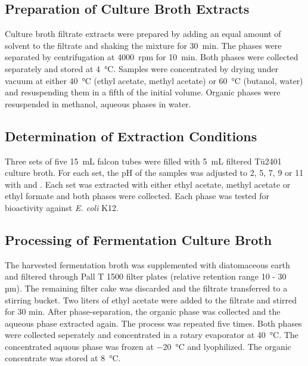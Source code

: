 \subsection{Preparation of Culture Broth Extracts} %
\label{sub:preparation_of_medium_extracts}

Culture broth filtrate extracts were prepared by adding an equal amount of solvent to the filtrate and shaking the mixture for \SI{30}{\minute}.
The phases were separated by centrifugation at 4000~rpm for \SI{10}{\minute}.
Both phases were collected separately and stored at \SI{4}{\celsius}.
Samples were concentrated by drying under vacuum at either \SI{40}{\celsius} (ethyl acetate, methyl acetate) or \SI{60}{\celsius} (butanol, water) and resuspending them in a fifth of the initial volume.
Organic phases were resuspended in methanol, aqueous phases in water.


\subsection{Determination of Extraction Conditions} %
\label{sub:determination_of_extraction_conditions}

Three sets of five \SI{15}{\milli\liter} falcon tubes were filled with \SI{5}{\milli\liter} filtered Tü2401 culture broth.
For each set, the pH of the samples was adjusted to 2, 5, 7, 9 or 11 with  and .
Each set was extracted with either ethyl acetate, methyl acetate or ethyl formate and both phases were collected.
Each phase was tested for bioactivity against \textit{E. coli} K12.


\subsection{Processing of Fermentation Culture Broth} %
\label{sub:processing_of_fermentation_broth}
The harvested fermentation broth was supplemented with diatomaceous earth and filtered through Pall T 1500 filter plates (relative retention range 10 - 30 µm).
The remaining filter cake was discarded and the filtrate transferred to a stirring bucket.
Two liters of ethyl acetate were added to the filtrate and stirred for 30 min.
After phase-separation, the organic phase was collected and the aqueous phase extracted again.
The process was repeated five times. Both phases were collected seperately and concentrated in a rotary evaporator at \SI{40}{\celsius}.
The concentrated aquous phase was frozen at \SI{-20}{\celsius} and lyophilized.
The organic concentrate was stored at \SI{8}{\celsius}.

